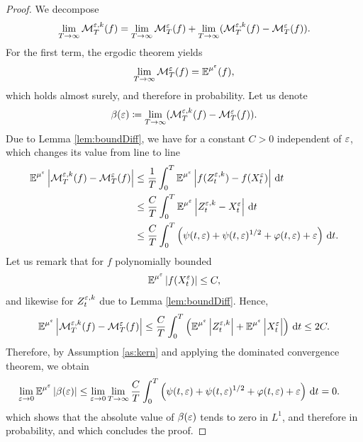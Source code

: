 \documentclass[10pt]{article}
\begin{document}
\begin{proof} We decompose
	\begin{equation}
		\lim_{T\to\infty} \mathcal M_T^{\varepsilon, k}(f) = \lim_{T\to\infty} \mathcal M_T^\varepsilon(f) + \lim_{T\to\infty} (\mathcal M_T^{\varepsilon, k}(f) - \mathcal M_T^\varepsilon(f)).
	\end{equation}
	For the first term, the ergodic theorem yields
	\begin{equation}
		\lim_{T\to\infty} \mathcal M_T^\varepsilon(f) = \operatorname{\mathbb{E}}^{\mu^\varepsilon}(f),
	\end{equation}
	which holds almost surely, and therefore in probability. Let us denote
	\begin{equation}
		\beta(\varepsilon) \coloneqq \lim_{T\to\infty}(\mathcal M_T^{\varepsilon, k}(f) - \mathcal M_T^\varepsilon(f)).
	\end{equation}
	Due to Lemma \ref{lem:boundDiff}, we have for a constant $C > 0$ independent of $\varepsilon$, which changes its value from line to line
	\begin{equation}
	\begin{aligned}
		\operatorname{\mathbb{E}}^{\mu^\varepsilon} \left\lvert\mathcal M_T^{\varepsilon, k}(f) - \mathcal M_T^\varepsilon(f)\right\rvert &\leq \frac1T \int_0^T \operatorname{\mathbb{E}}^{\mu^\varepsilon}\left\lvert f(Z_t^{\varepsilon,k}) - f(X_t^\varepsilon)\right\rvert \,\mathrm{d} t\\
		&\leq \frac{C}{T} \int_0^T \operatorname{\mathbb{E}}^{\mu^\varepsilon}\left\lvert Z_t^{\varepsilon,k} - X_t^\varepsilon\right\rvert \,\mathrm{d} t \\
		&\leq \frac{C}{T} \int_0^T \left(\psi(t, \varepsilon) + \psi(t, \varepsilon)^{1/2} + \varphi(t, \varepsilon) + \varepsilon\right) \,\mathrm{d} t.
	\end{aligned}
	\end{equation}
	Let us remark that for $f$ polynomially bounded
	\begin{equation}
		\operatorname{\mathbb{E}}^{\mu^\varepsilon}\left\lvert f(X_t^\varepsilon)\right\rvert \leq C, 
	\end{equation}
	and likewise for $Z_t^{\varepsilon, k}$ due to Lemma \ref{lem:boundDiff}. Hence,
	\begin{equation}
		\E^{\mu^\epl} \abs{\mathcal M_T^{\epl, k}(f) - \mathcal M_T^\epl(f)} \leq \frac{C}{T} \int_0^T \left(\E^{\mu^\epl}\abs{Z_t^{\epl,k}} + \E^{\mu^\epl}\abs{X_t^\epl \vphantom{Z_t^{\epl,k}}}\right) \dd t \leq 2C.
	\end{equation}
	Therefore, by Assumption \ref{as:kern} and applying the dominated convergence theorem, we obtain
	\begin{equation}
	\begin{aligned}
		\lim_{\varepsilon \to 0} \operatorname{\mathbb{E}}^{\mu^\varepsilon}\left\lvert\beta(\varepsilon)\right\rvert &\leq \lim_{\varepsilon \to 0} \lim_{T\to\infty} \frac{C}{T} \int_0^T \left(\psi(t, \varepsilon) + \psi(t, \varepsilon)^{1/2} + \varphi(t, \varepsilon) + \varepsilon\right) \,\mathrm{d} t = 0.
	\end{aligned}
	\end{equation}
	which shows that the absolute value of $\beta(\varepsilon)$ tends to zero in $L^1$, and therefore in probability, and which concludes the proof.
\end{proof}
\end{document}
